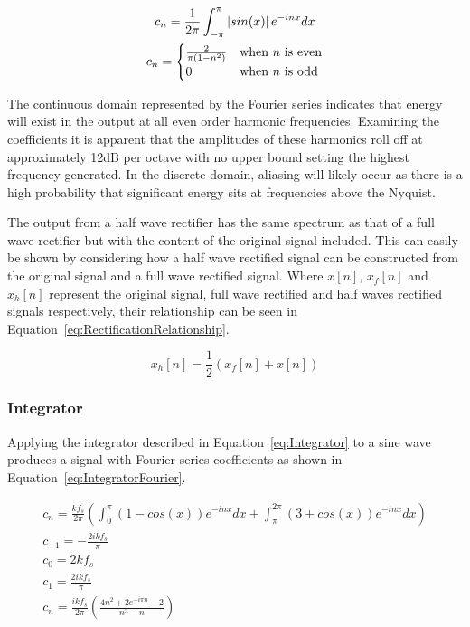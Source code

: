 			\begin{gather}
				c_{n} = \frac{1}{2\pi} \int_{-\pi}^{\pi} \left|sin(x)\right|e^{-inx} dx \nonumber \\
				c_{n} = \begin{cases}
					\frac{2}{\pi(1 - n^{2})} & \text{when $n$ is even} \\
					0 & \text{when $n$ is odd}
				\end{cases}
				\label{eq:RectificationFourier}
			\end{gather}

			The continuous domain represented by the Fourier series indicates that energy will exist in the
			output at all even order harmonic frequencies. Examining the coefficients it is apparent that the
			amplitudes of these harmonics roll off at approximately 12dB per octave with no upper bound setting
			the highest frequency generated. In the discrete domain, aliasing will likely occur as there is a
			high probability that significant energy sits at frequencies above the Nyquist.

			The output from a half wave rectifier has the same spectrum as that of a full wave rectifier but
			with the content of the original signal included. This can easily be shown by considering how a
			half wave rectified signal can be constructed from the original signal and a full wave rectified
			signal.  Where $x[n]$, $x_{f}[n]$ and $x_{h}[n]$ represent the original signal, full wave rectified
			and half waves rectified signals respectively, their relationship can be seen in
			Equation~\ref{eq:RectificationRelationship}.

			\begin{equation}
				x_{h}[n] = \frac{1}{2} \left( x_{f}[n] + x[n] \right)
				\label{eq:RectificationRelationship}
			\end{equation}

		\subsubsection*{Integrator}
			Applying the integrator described in Equation~\ref{eq:Integrator} to a sine wave produces a signal
			with Fourier series coefficients as shown in Equation~\ref{eq:IntegratorFourier}.

			\begin{gather}
				c_{n} = \frac{kf_{s}}{2\pi} \left( \int_{0}^{\pi} (1 - cos(x))e^{-inx} dx +
							\int_{\pi}^{2\pi} (3 + cos(x))e^{-inx} dx \right) \nonumber \\
				c_{-1} = - \frac{2ikf_{s}}{\pi} \nonumber \\
				c_{0} = 2kf_{s} \nonumber \\
				c_{1} = \frac{2ikf_{s}}{\pi} \nonumber \\
				c_{n} = \frac{ikf_{s}}{2\pi} \left( \frac{4n^{2} + 2e^{-i\pi n} - 2}{n^{3} - n} \right)
				\label{eq:IntegratorFourier}
			\end{gather}

